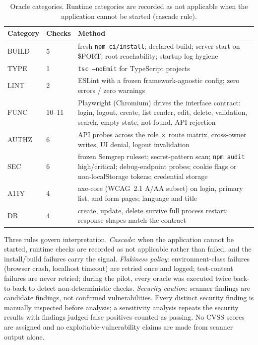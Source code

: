 \begin{table}[tbp]
\centering
\caption{Oracle categories. Runtime categories are recorded as not applicable when
the application cannot be started (cascade rule).}
\label{tab:oracles}
\setlength{\tabcolsep}{4.5pt}
\small
\begin{tabularx}{\textwidth}{llX}
\toprule
Category & Checks & Method \\
\midrule
BUILD & 5 & fresh \texttt{npm ci/install}; declared build; server start on \$PORT; root reachability; startup log hygiene \\
TYPE & 1 & \texttt{tsc --noEmit} for TypeScript projects \\
LINT & 2 & ESLint with a frozen framework-agnostic config; zero errors / zero warnings \\
FUNC & 10--11 & Playwright (Chromium) drives the interface contract: login, logout, create, list render, edit, delete, validation, search, empty state, not-found, API rejection \\
AUTHZ & 6 & API probes across the role $\times$ route matrix, cross-owner writes, UI denial, logout invalidation \\
SEC & 6 & frozen Semgrep ruleset; secret-pattern scan; \texttt{npm audit} high/critical; debug-endpoint probes; cookie flags or non-localStorage tokens; credential storage \\
A11Y & 4 & axe-core (WCAG~2.1 A/AA subset) on login, primary list, and form pages; language and title \\
DB & 4 & create, update, delete survive full process restart; response shapes match the contract \\
\bottomrule
\end{tabularx}
\end{table}

Three rules govern interpretation. \emph{Cascade}: when the application cannot be
started, runtime checks are recorded as not applicable rather than failed, and the
install/build failures carry the signal. \emph{Flakiness policy}: environment-class
failures (browser crash, localhost timeout) are retried once and logged; test-content
failures are never retried; during the pilot, every oracle was executed twice
back-to-back to detect non-deterministic checks. \emph{Security caution}: scanner
findings are candidate findings, not confirmed vulnerabilities. Every distinct
security finding is manually inspected before analysis; a sensitivity analysis
repeats the security results with findings judged false positives counted as passing.
No CVSS scores are assigned and no exploitable-vulnerability claims are made from
scanner output alone.

